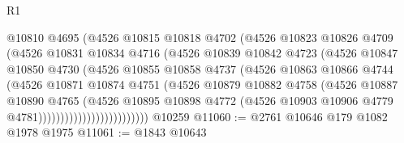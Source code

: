 \begin{lexlean}{R1}
\begin{coremodule}
                              @10810
                              @4695
                              (@4526
                                @10815
                                @10818
                                @4702
                                (@4526
                                  @10823
                                  @10826
                                  @4709
                                  (@4526
                                    @10831
                                    @10834
                                    @4716
                                    (@4526
                                      @10839
                                      @10842
                                      @4723
                                      (@4526
                                        @10847
                                        @10850
                                        @4730
                                        (@4526
                                          @10855
                                          @10858
                                          @4737
                                          (@4526
                                            @10863
                                            @10866
                                            @4744
                                            (@4526
                                              @10871
                                              @10874
                                              @4751
                                              (@4526
                                                @10879
                                                @10882
                                                @4758
                                                (@4526
                                                  @10887
                                                  @10890
                                                  @4765
                                                  (@4526
                                                    @10895
                                                    @10898
                                                    @4772
                                                    (@4526
                                                      @10903
                                                      @10906
                                                      @4779
                                                      @4781)))))))))))))))))))))))))
    @10259
@11060 := @2761 @10646 @179 @1082 @1978 @1975
@11061 := @1843 @10643

\end{coremodule}
\end{lexlean}
